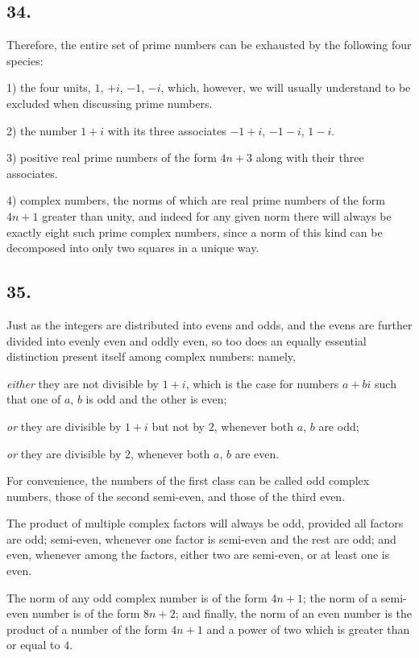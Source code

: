 \documentclass[twoside,12pt]{memoir}
\begin{document}
\subsection*{34.}

Therefore, the entire set of prime numbers can be exhausted by the following four species:

1) the four units, \(1\), \(+i\), \(-1\), \(-i\), which, however, we will usually understand to be excluded when discussing prime numbers.

2) the number \(1+i\) with its three associates \(-1+i\), \(-1-i\), \(1-i\).

3) positive real prime numbers of the form \(4n+3\) along with their three associates.

4) complex numbers, the norms of which are real prime numbers of the form \(4n+1\) greater than unity, and indeed for any given norm there will always be exactly eight such prime complex numbers, since a norm of this kind can be decomposed into only two squares in a unique way.

\subsection*{35.}

Just as the integers are distributed into evens and odds, and the evens are further divided into evenly even and oddly even, so too does an equally essential distinction present itself among complex numbers: namely,

\textit{either} they are not divisible by \(1+i\), which is the case for numbers \(a+bi\) such that one of \(a\), \(b\) is odd and the other is even;

\textit{or} they are divisible by \(1+i\) but not by \(2\), whenever both \(a\), \(b\) are odd;

\textit{or} they are divisible by \(2\), whenever both \(a\), \(b\) are even.

For convenience, the numbers of the first class can be called odd complex numbers, those of the second semi-even, and those of the third even.

The product of multiple complex factors will always be odd, provided all factors are odd; semi-even, whenever one factor is semi-even and the rest are odd; and even, whenever among the factors, either two are semi-even, or at least one is even.

The norm of any odd complex number is of the form \(4n+1\); the norm of a semi-even number is of the form \(8n+2\); and finally, the norm of an even number is the product of a number of the form \(4n+1\) and a power of two which is greater than or equal to \(4\).
\end{document}
